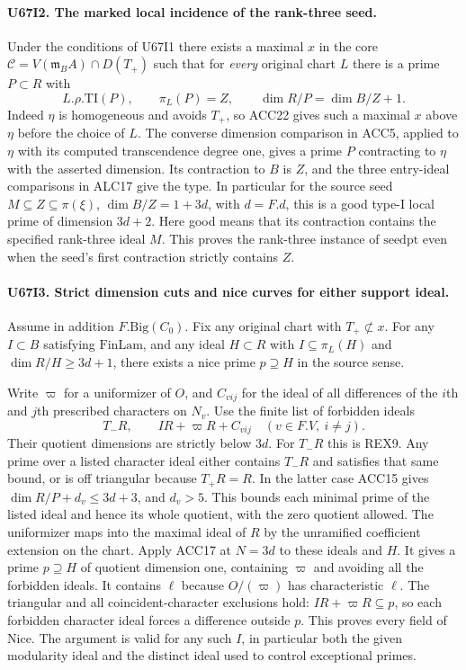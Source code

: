 \paragraph{U67I2. The marked local incidence of the rank-three seed.}
Under the conditions of U67I1 there exists a maximal $x$ in the core
$\mathcal C=V(\mathfrak m_B A)\cap D(T_+)$ such that for
\emph{every} original chart $L$ there is a prime $P\subset R$ with
\[
             L.\rho.\mathrm{TI}(P),\qquad \pi_L(P)=Z,\qquad
             \dim R/P=\dim B/Z+1 .
\]
Indeed $\eta$ is homogeneous and avoids $T_+$, so ACC22 gives
such a maximal $x$ above $\eta$ before the choice of $L$.
The converse dimension comparison in ACC5, applied to $\eta$ with
its computed transcendence degree one, gives a prime $P$ contracting
to $\eta$ with the asserted dimension. Its contraction to $B$ is
$Z$, and the three entry-ideal comparisons in ALC17 give the type.
In particular for the source seed $M\subseteq Z\subseteq\pi(\xi)$,
$\dim B/Z=1+3d$, with $d=F.d$, this is a good type-I local prime
of dimension $3d+2$. Here good means that its contraction contains
the specified rank-three ideal $M$. This proves the rank-three
instance of $\mathrm{seedpt}$ even when the seed's first contraction
strictly contains $Z$.

\paragraph{U67I3. Strict dimension cuts and nice curves for either support ideal.}
Assume in addition $F.\mathrm{Big}(C_0)$. Fix any original chart
with $T_+\not\subset x$. For any $I\subset B$ satisfying
$\mathrm{FinLam}$, and any ideal $H\subset R$ with
$I\subseteq\pi_L(H)$ and $\dim R/H\ge3d+1$, there exists a
nice prime $p\supseteq H$ in the source sense.

Write $\varpi$ for a uniformizer of $O$, and $C_{vij}$ for the
ideal of all differences of the $i$th and $j$th prescribed
characters on $N_v$. Use the finite list of forbidden ideals
\[
            T_-R,\qquad IR+\varpi R+C_{vij}
                        \quad(v\in F.V,\ i\ne j).
\]
Their quotient dimensions are strictly below $3d$. For $T_-R$
this is REX9. Any prime over a listed character ideal either
contains $T_-R$ and satisfies that same bound, or is off triangular
because $T_+R=R$. In the latter case ACC15 gives
$\dim R/P+d_v\le3d+3$, and $d_v>5$. This bounds each minimal
prime of the listed ideal and hence its whole quotient, with the
zero quotient allowed. The uniformizer maps into the maximal ideal
of $R$ by the unramified coefficient extension on the chart.
Apply ACC17 at $N=3d$ to these ideals and $H$. It gives a prime
$p\supseteq H$ of quotient dimension one, containing $\varpi$
and avoiding all the forbidden ideals. It contains $\ell$ because
$O/(\varpi)$ has characteristic $\ell$. The triangular and
all coincident-character exclusions hold: $IR+\varpi R\subseteq p$,
so each forbidden character ideal forces a difference outside $p$.
This proves every field of $\mathrm{Nice}$. The argument is valid
for any such $I$, in particular both the given modularity ideal and
the distinct ideal used to control exceptional primes.

